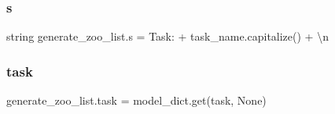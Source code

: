 \subsubsection{\texorpdfstring{s}{s}}
{\footnotesize\ttfamily string generate\+\_\+zoo\+\_\+list.\+s = \textquotesingle{}Task\+: \textquotesingle{} + task\+\_\+name.\+capitalize() + \textquotesingle{}\textbackslash{}n\textquotesingle{}}

\mbox{\label{namespacegenerate__zoo__list_ad3dbd35f1d59cff673fdcbc18b300da2}} 
\subsubsection{\texorpdfstring{task}{task}}
{\footnotesize\ttfamily generate\+\_\+zoo\+\_\+list.\+task = model\+\_\+dict.\+get(\textquotesingle{}task\textquotesingle{}, None)}

